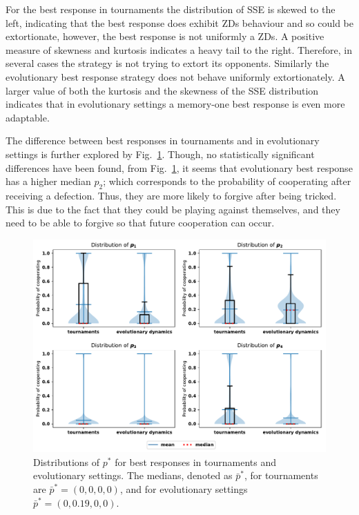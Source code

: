 \documentclass[10pt]{article}
\begin{document}
For the best response in tournaments the distribution of SSE is skewed to the
left, indicating that the best response does exhibit ZDs behaviour and so could
be extortionate,
however, the best response is not uniformly a ZDs. A positive measure of
skewness and kurtosis indicates a heavy tail to the right. Therefore, in several
cases the strategy is not trying to extort its opponents. Similarly the
evolutionary best response strategy does not behave uniformly extortionately. A
larger value of both the kurtosis and the skewness of the SSE distribution
indicates that in evolutionary settings a memory-one best response is even more
adaptable.

The difference between best responses in tournaments and in evolutionary
settings is further explored by Fig.~\ref{fig:behaviour_violin_plots}.
Though, no statistically significant differences have been found, from
Fig.~\ref{fig:behaviour_violin_plots}, it seems that evolutionary best
response has a higher median $p_2$; which corresponds to the probability of cooperating
after receiving a defection. Thus, they are more likely to forgive after
being tricked. This is due to the fact that they could be playing against
themselves, and they need to be able to forgive so that future cooperation can
occur.

\begin{table}
\begin{center}
\end{center}
\caption{SSE of best response memory-one when \(N=2\)}\label{table:sserror_stats}
\end{table}

\begin{figure}[!htbp]
    \centering
    \includegraphics[width=.55\textwidth]{img/behaviour_violin_plots.pdf}
    \caption{Distributions of \(p^*\) for best responses in tournaments and
    evolutionary settings. The medians, denoted as \(\bar{p}^*\), for tournaments
    are \(\bar{p}^* = (0, 0, 0, 0)\), and for evolutionary settings
    \(\bar{p}^* = (0, 0.19, 0, 0)\).}
    \label{fig:behaviour_violin_plots}
\end{figure}
\end{document}
